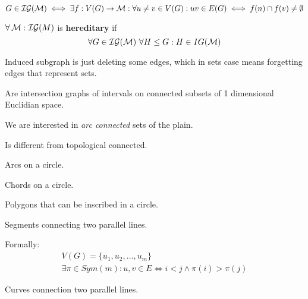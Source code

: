 \begin{observation}
	\[ G \in \operatorname{\mathcal{IG}}(\operatorname{\mathcal{M}}) \iff \exists f:V(G) \to \operatorname{\mathcal{M}}: \forall u \ne v \in V(G): uv \in E(G) \iff f(n) \cap f(v) \ne \emptyset \]
\end{observation}

\begin{observation}
	$\forall \operatorname{\mathcal{M}}: \operatorname{\mathcal{IG}}(M)$ is \textbf{hereditary} if
	\[ \forall G \in \operatorname{\mathcal{IG}}(\operatorname{\mathcal{M}}) \ \forall H \leq G: H \in IG(\operatorname{\mathcal{M}}) \]

	Induced subgraph is just deleting some edges, which in sets case means forgetting edges that represent sets.
\end{observation}

\begin{definition}
	Are intersection graphs of intervals on connected subsets of 1 dimensional Euclidian space.
\end{definition}

We are interested in \emph{arc connected} sets of the plain.
\begin{definition}

	Is different from topological connected.
\end{definition}

\begin{definition}
	Arcs on a circle.
\end{definition}

\begin{definition}
	Chords on a circle.
\end{definition}

\begin{definition}
	Polygons that can be inscribed in a circle.
\end{definition}

\begin{definition}
	Segments connecting two parallel lines.

	Formally:
	\begin{gather*}
		V(G) = \{ u_1, u_2, \ldots, u_m \} \\
		\exists \pi \in Sym(m): u,v \in E \iff i < j \land \pi(i) > \pi (j)
	\end{gather*}
\end{definition}

\begin{definition}
	Curves connection two parallel lines.
\end{definition}

